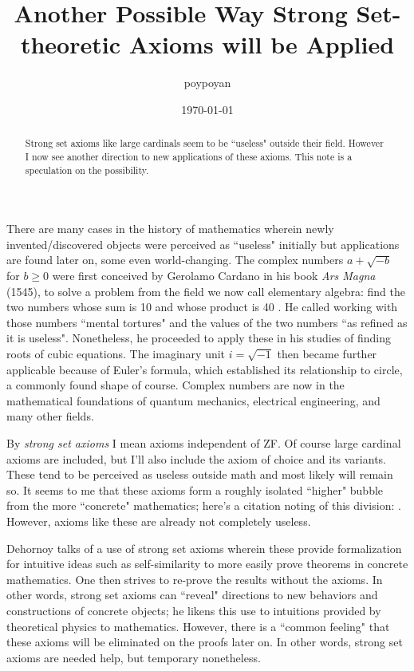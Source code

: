 \documentclass{article}
\title{Another Possible Way Strong Set-theoretic Axioms will be Applied}
\author{poypoyan}
\date{\petsa\today}
\theoremstyle{plain}
\begin{document}
\maketitle

\begin{abstract}
Strong set axioms like large cardinals seem to be ``useless" outside their field. However I now see another direction to new applications of these axioms. This note is a speculation on the possibility.
\end{abstract}

There are many cases in the history of mathematics wherein newly invented/discovered objects were perceived as ``useless" initially but applications are found later on, some even world-changing. The complex numbers $a + \sqrt{-b}$ for $b \ge 0$ were first conceived by Gerolamo Cardano in his book \textit{Ars Magna} (1545), to solve a problem from the field we now call elementary algebra: find the two numbers whose sum is 10 and whose product is 40 \cite[p.~253]{history}. He called working with those numbers ``mental tortures" and the values of the two numbers ``as refined as it is useless". Nonetheless, he proceeded to apply these in his studies of finding roots of cubic equations. The imaginary unit $i=\sqrt{-1}$ then became further applicable because of Euler's formula, which established its relationship to circle, a commonly found shape of course. Complex numbers are now in the mathematical foundations of quantum mechanics, electrical engineering, and many other fields.

By \textit{strong set axioms} I mean axioms independent of \textsf{ZF}. Of course large cardinal axioms are included, but I'll also include the axiom of choice and its variants. These tend to be perceived as useless outside math and most likely will remain so. It seems to me that these axioms form a roughly isolated ``higher" bubble from the more ``concrete" mathematics; here's a citation noting of this division: \cite{simpson}. However, axioms like these are already not completely useless.

Dehornoy \cite{dehornoy} talks of a use of strong set axioms wherein these provide formalization for intuitive ideas such as self-similarity to more easily prove theorems in concrete mathematics. One then strives to re-prove the results without the axioms. In other words, strong set axioms can ``reveal" directions to new behaviors and constructions of concrete objects; he likens this use to intuitions provided by theoretical physics to mathematics. However, there is a ``common feeling" that these axioms will be eliminated on the proofs later on. In other words, strong set axioms are needed help, but temporary nonetheless.
\end{document}
